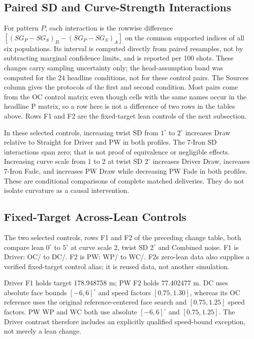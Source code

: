 \documentclass[11pt,letterpaper]{article}
\begin{document}
\subsection{Paired SD and Curve-Strength Interactions}

For pattern $P$, each interaction is the rowwise difference $[(SG_P-SG_S)_B-(SG_P-SG_S)_A]$ on the common supported indices of all six populations. Its interval is computed directly from \BootstrapResamples{} paired resamples, not by subtracting marginal confidence limits, and is reported per 100 shots. These changes carry sampling uncertainty only; the head-assumption band was computed for the 24 headline conditions, not for these control pairs. The Sources column gives the protocols of the first and second condition. Most pairs come from the OC control matrix even though cells with the same names occur in the headline P matrix, so a row here is not a difference of two rows in the tables above. Rows F1 and F2 are the fixed-target lean controls of the next subsection.



In these selected controls, increasing twist SD from $1^\circ$ to $2^\circ$ increases Draw relative to Straight for Driver and PW in both profiles. The 7-Iron SD interactions span zero; that is not proof of equivalence or negligible effects. Increasing curve scale from 1 to 2 at twist SD $2^\circ$ increases Driver Draw, increases 7-Iron Fade, and increases PW Draw while decreasing PW Fade in both profiles. These are conditional comparisons of complete matched deliveries. They do not isolate curvature as a causal intervention.

\subsection{Fixed-Target Across-Lean Controls}

The two selected controls, rows F1 and F2 of the preceding change table, both compare lean $0^\circ$ to $5^\circ$ at curve scale 2, twist SD $2^\circ$ and Combined noise. F1 is Driver: OC/ to DC/. F2 is PW: WP/ to WC/. F2\textquotesingle s zero-lean data also supplies a verified fixed-target control alias; it is reused data, not another simulation.

Driver F1 holds target 178.948758 m; PW F2 holds 77.402477 m. DC uses absolute face bounds $[-6,6]^\circ$ and speed factors $[0.75,1.30]$, whereas its OC reference uses the original reference-centered face search and $[0.75,1.25]$ speed factors. PW WP and WC both use absolute $[-6,6]^\circ$ and $[0.75,1.25]$. The Driver contrast therefore includes an explicitly qualified speed-bound exception, not merely a lean change.
\end{document}
